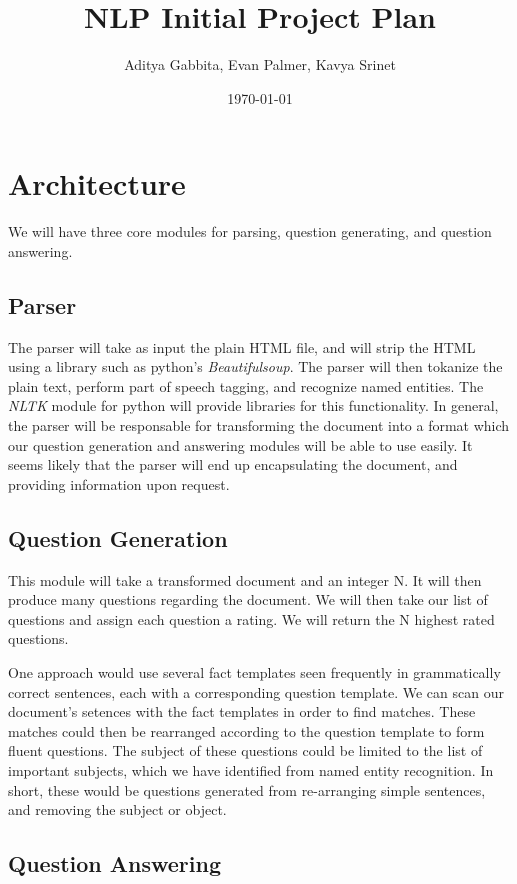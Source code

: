 \documentclass[12pt]{article}
\title{NLP Initial Project Plan}
\date{\today}
\author{Aditya Gabbita, Evan Palmer, Kavya Srinet}
\begin{document}
\maketitle

\section{Architecture}

We will have three core modules for parsing, question generating, and question answering. 

\subsection{Parser}

The parser will take as input the plain HTML file, and will strip the HTML using a library such as python's \emph{Beautifulsoup}. The parser will then tokanize the plain text, perform part of speech tagging, and recognize named entities. The \emph{NLTK} module for python will provide libraries for this functionality. In general, the parser will be responsable for transforming the document into a format which our question generation and answering modules will be able to use easily. It seems likely that the parser will end up encapsulating the document, and providing information upon request.

\subsection{Question Generation}

This module will take a transformed document and an integer N. It will then produce many questions regarding the document. We will then take our list of questions and assign each question a rating. We will return the N highest rated questions.


One approach would use several fact templates seen frequently in grammatically correct sentences, each with a corresponding question template. We can scan our document's setences with the fact templates in order to find matches. These matches could then be rearranged according to the question template to form fluent questions. The subject of these questions could be limited to the list of important subjects, which we have identified from named entity recognition. In short, these would be questions generated from re-arranging simple sentences, and removing the subject or object.


\subsection{Question Answering}
\end{document}
